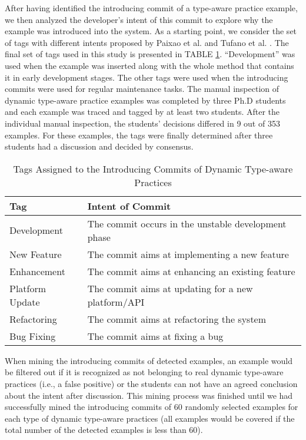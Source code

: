 After having identified the introducing commit of a type-aware practice example, we then analyzed the developer's intent of this commit to explore why the example was introduced into the system. As a starting point, we consider the set of tags with different intents proposed by Paixao et al. \cite{b29} and Tufano et al. \cite{b30}. The final set of tags used in this study is presented in TABLE \ref{tab:tags}. ``Development'' was used when the example was inserted along with the whole method that contains it in early development stages. The other tags were used when the introducing commits were used for regular maintenance tasks.
The manual inspection of dynamic type-aware practice examples was completed by three Ph.D students and each example was traced and tagged by at least two students. After the individual manual inspection, the students' decisions differed in 9 out of 353 examples. For these examples, the tags were finally determined after three students had a discussion and decided by consensus.

\begin{table}
	\caption{Tags Assigned to the Introducing Commits of Dynamic Type-aware Practices}
	\centering
	\vspace{-10pt}
	\label{tab:tags}
	\begin{tabular}{ll}
		\hline
		\textbf{Tag} & \textbf{Intent of Commit}\\
		\hline
		Development & The commit occurs in the unstable development phase\\
		New Feature &The commit aims at implementing a new feature\\
		Enhancement &The commit aims at enhancing an existing feature\\
		Platform Update &The commit aims at updating for a new platform/API\\
		Refactoring &The commit aims at refactoring the system\\
		Bug Fixing &The commit aims at fixing a bug\\
		\hline
	\end{tabular}
\end{table}

When mining the introducing commits of detected examples, an example would be filtered out if it is recognized as not belonging to real dynamic type-aware practices (i.e., a false positive) or the students can not have an agreed conclusion about the intent after discussion.
This mining process was finished until we had successfully mined the introducing commits of 60 randomly selected examples for each type of dynamic type-aware practices (all examples would be covered if the total number of the detected examples is less than 60).


